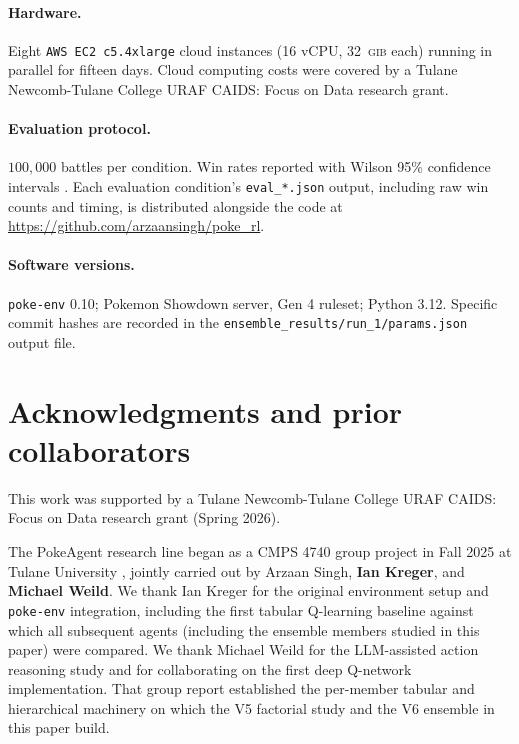 \paragraph{Hardware.}
Eight \texttt{AWS EC2 c5.4xlarge} cloud instances (16 vCPU, 32~\textsc{gib}
each) running in parallel for fifteen days. Cloud computing costs were
covered by a Tulane Newcomb-Tulane College URAF CAIDS: Focus on Data
research grant.

\paragraph{Evaluation protocol.}
$100{,}000$ battles per condition. Win rates reported with Wilson 95\%
confidence intervals \citep{wilson1927}. Each evaluation condition's
\texttt{eval\_*.json} output, including raw win counts and timing, is
distributed alongside the code at
\url{https://github.com/arzaansingh/poke_rl}.

\paragraph{Software versions.}
\texttt{poke-env} 0.10; Pokemon Showdown server, Gen 4 ruleset; Python
3.12. Specific commit hashes are recorded in the
\texttt{ensemble\_results/run\_1/params.json} output file.

\section{Acknowledgments and prior collaborators}
\label{app:acknowledgments}

This work was supported by a Tulane Newcomb-Tulane College URAF
CAIDS: Focus on Data research grant (Spring 2026).

The PokeAgent research line began as a CMPS 4740 group project in
Fall 2025 at Tulane University \citep{singh2025cmps4740}, jointly carried
out by Arzaan Singh, \textbf{Ian Kreger}, and \textbf{Michael Weild}.
We thank Ian Kreger for the original environment setup and
\texttt{poke-env} integration, including the first tabular Q-learning
baseline against which all subsequent agents (including the ensemble
members studied in this paper) were compared. We thank Michael Weild
for the LLM-assisted action reasoning study and for collaborating on the
first deep Q-network implementation. That group report established the
per-member tabular and hierarchical machinery on which the V5 factorial
study \citep{singh2026v5} and the V6 ensemble in this paper build.
